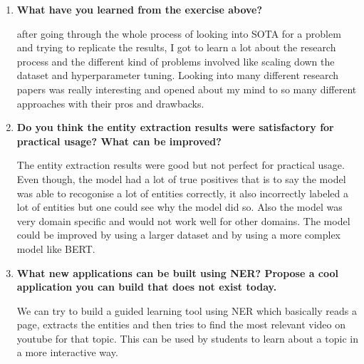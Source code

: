 \documentclass{article}
\begin{document}
\begin{enumerate}
    \item \textbf{What have you learned from the exercise above?}
    
    after going through the whole process of looking into SOTA for a problem and trying to replicate the results, I got to learn a lot about the research process and the different kind of problems involved like scaling down the dataset and hyperparameter tuning. Looking into many different research papers was really interesting and opened about my mind to so many different approaches with their pros and drawbacks.
    
    \item \textbf{Do you think the entity extraction results were satisfactory for practical usage? What can be improved?}
    
    The entity extraction results were good but not perfect for practical usage. Even though, the model had a lot of true positives that is to say the model was able to recogonise a lot of entities correctly, it also incorrectly labeled a lot of entities but one could see why the model did so. Also the model was very domain specific and would not work well for other domains. The model could be improved by using a larger dataset and by using a more complex model like BERT.
    
    \item \textbf{What new applications can be built using NER? Propose a cool application you can build that does not exist today.}
    
    We can try to build a guided learning tool using NER which basically reads a page, extracts the entities and then tries to find the most relevant video on youtube for that topic. This can be used by students to learn about a topic in a more interactive way.
\end{enumerate}
\end{document}
